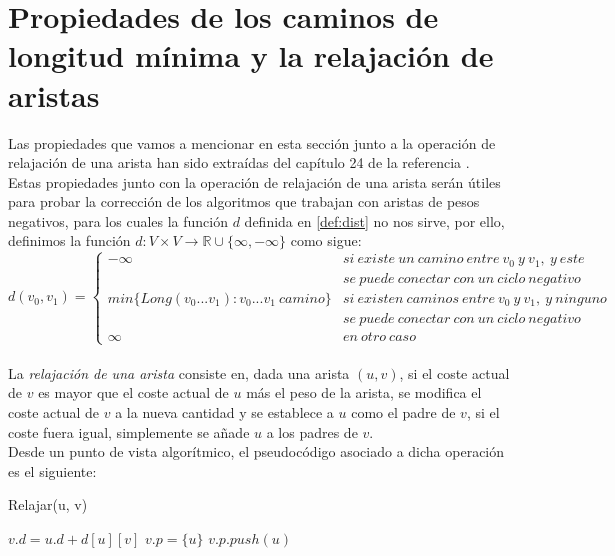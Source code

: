 \section{Propiedades de los caminos de longitud mínima y la relajación de aristas}\label{sec:2.2}

Las propiedades que vamos a mencionar en esta sección junto a la operación de relajación de una arista han sido extraídas del capítulo 24 de la referencia \cite{algorithms}. \\

Estas propiedades junto con la operación de relajación de una arista serán útiles para probar la corrección de los algoritmos que trabajan con aristas de pesos negativos, para los cuales la función $d$ definida en \autoref{def:dist} no nos sirve, por ello, definimos la función $d:V\times V \rightarrow \mathbb{R}\cup \{\infty,-\infty\}$ como sigue:
$$d(v_0,v_1)= \left\{ \begin{array}{lcc}
	-\infty & si\ existe\ un\ camino\ entre\ v_0\ y\ v_1,\ y\ este\\ & se\ puede\ conectar\ con\ un\ ciclo\ negativo
	\\ min\{Long(v_0...v_1) : v_0...v_1\ camino\} &   si\ existen\ caminos\ entre\ v_0\ y\ v_1,\ y\ ninguno\\ & se\ puede\ conectar\ con\ un\ ciclo\ negativo
	\\ \infty &  en\ otro\ caso
\end{array}
\right.$$ \\


La \textit{relajación de una arista} consiste en, dada una arista $(u,v)$, si el coste actual de $v$ es mayor que el coste actual de $u$ más el peso de la arista, se modifica el coste actual de $v$ a la nueva cantidad y se establece a $u$ como el padre de $v$, si el coste fuera igual, simplemente se añade $u$ a los padres de $v$. \\

Desde un punto de vista algorítmico, el pseudocódigo asociado a dicha operación es el siguiente:

\begin{breakablealgorithm}
	\caption{Relajar(u, v)}
	\begin{algorithmic}[1]
			\State $v.d = u.d + d[u][v]$
			\State $v.p = \{u\}$
				\State $v.p.push(u)$
			\EndIf
		\EndIf
	\end{algorithmic}
\end{breakablealgorithm}

